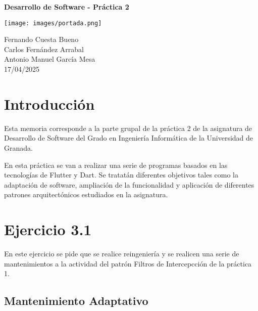 \documentclass[12pt]{article}
\begin{document}
\begin{titlepage}

    \centering
    \vspace*{1cm}
    \vspace{0.5cm}
    {\Huge\bfseries Desarrollo de Software - Práctica 2 \par}
    \vspace{1.5cm}
    \texttt{[image: images/portada.png]}
    \vspace{1.5cm}
    \par %
    \vspace{1cm}
    {\Large Fernando Cuesta Bueno
        \\
        Carlos Fernández Arrabal
        \\
        Antonio Manuel García Mesa
        \\
        17/04/2025\par}

\end{titlepage}

\tableofcontents

\newpage

\section{Introducción}
Esta memoria corresponde a la parte grupal de la práctica 2 de la asignatura de Desarrollo de Software del Grado en Ingeniería Informática de la Universidad de Granada.

En esta práctica se van a realizar una serie de programas basados en las tecnologías de Flutter y Dart.
Se tratatán diferentes objetivos tales como la adaptación de software, ampliación de la funcionalidad y aplicación de diferentes patrones arquitectónicos estudiados en la asignatura.

\section{Ejercicio 3.1}

En este ejercicio se pide que se realice reingeniería y se realicen una serie de mantenimientos a la actividad del patrón Filtros de Intercepcción de la práctica 1.

\subsection{Mantenimiento Adaptativo}
\end{document}
